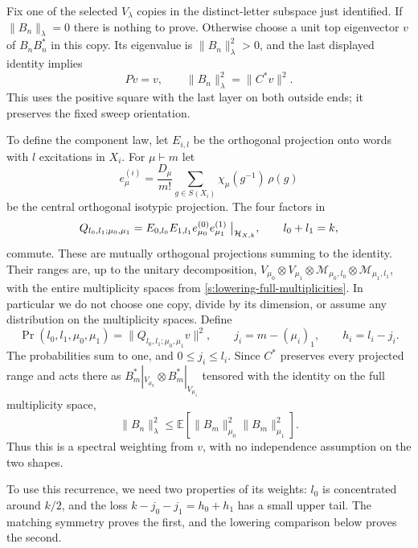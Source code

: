 Fix one of the selected \(V_\lambda\) copies in the distinct-letter
subspace just identified.
If \(\|B_n\|_\lambda=0\) there is nothing to prove.  Otherwise choose a
unit top eigenvector \(v\) of \(B_nB_n^*\) in this copy.  Its eigenvalue
is \(\|B_n\|_\lambda^2>0\), and the last displayed identity implies
\[
 Pv=v,\qquad
 \|B_n\|_\lambda^2=\|C^*v\|^2.
\]
This uses the positive square with the last layer on both outside ends;
it preserves the fixed sweep orientation.

To define the component law, let \(E_{i,l}\) be the orthogonal projection
onto words with \(l\) excitations in \(X_i\).  For \(\mu\vdash m\) let
\[
 e_\mu^{(i)}
   =\frac{D_\mu}{m!}\sum_{g\in S(X_i)}
        \chi_\mu(g^{-1})\,\rho(g)
\]
be the central orthogonal isotypic projection.  The four factors in
\[
 Q_{l_0,l_1;\mu_0,\mu_1}
   =E_{0,l_0}E_{1,l_1}e_{\mu_0}^{(0)}e_{\mu_1}^{(1)}
       \bigm|_{\mathcal H_{X,k}},
 \qquad l_0+l_1=k,
\]
commute.  These are mutually orthogonal projections summing to the
identity.  Their ranges are, up to the unitary decomposition,
\(V_{\mu_0}\otimes V_{\mu_1}\otimes
\mathcal M_{\mu_0,l_0}\otimes\mathcal M_{\mu_1,l_1}\), with the entire
multiplicity spaces from
\eqref{s:lowering-full-multiplicities}.  In particular we do not
choose one copy, divide by its dimension, or assume any distribution on
the multiplicity spaces.  Define
\[
 \Pr(l_0,l_1,\mu_0,\mu_1)
       =\|Q_{l_0,l_1;\mu_0,\mu_1}v\|^2,\qquad
 j_i=m-(\mu_i)_1,\qquad h_i=l_i-j_i .
\]
The probabilities sum to one, and \(0\le j_i\le l_i\).  Since \(C^*\)
preserves every projected range and acts there as
\(B_m^*|_{V_{\mu_0}}\otimes B_m^*|_{V_{\mu_1}}\) tensored with the
identity on the full multiplicity space,
\begin{equation}\label{s:lowering-backward-recursion}
 \|B_n\|_\lambda^2
 \le\mathbb E\!\left[
       \|B_m\|_{\mu_0}^2\|B_m\|_{\mu_1}^2\right].
\end{equation}
Thus this is a spectral weighting from \(v\), with no independence
assumption on the two shapes.

To use this recurrence, we need two properties of its weights:
\(l_0\) is concentrated around \(k/2\), and the loss
\(k-j_0-j_1=h_0+h_1\) has a small upper tail. The matching symmetry
proves the first, and the lowering comparison below proves the second.

